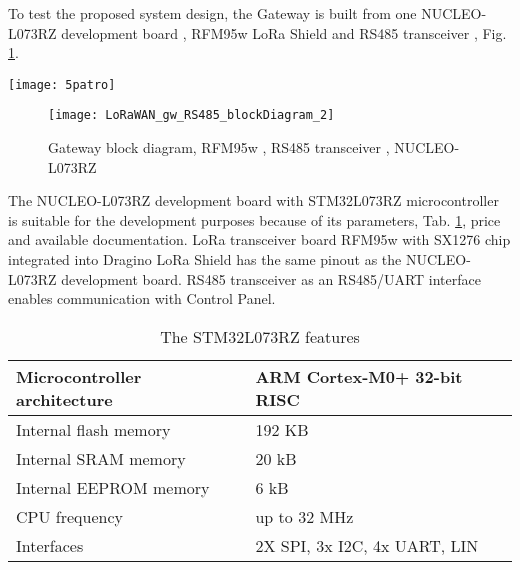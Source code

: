 To test the proposed system design, the Gateway is built from one NUCLEO-L073RZ development board \cite{nucleoST}, RFM95w LoRa Shield \cite{RFM95w} and RS485 transceiver \cite{rs485tr}, Fig. \ref{fig:gatewayBlockDiagram}.


\begin{figure*}[!ht]
    \centering
    \texttt{[image: 5patro]}
    \caption{Location of sensor nodes and CKP devices on the university floor}
    \label{fig:CorridorFloorPlan}
\end{figure*}


\begin{figure}[!h]
    \centering
    \texttt{[image: LoRaWAN\_gw\_RS485\_blockDiagram\_2]}
    \caption{Gateway block diagram, RFM95w \cite{RFM95w}, RS485 transceiver \cite{rs485tr}, NUCLEO-L073RZ \cite{nucleoST}}
    \label{fig:gatewayBlockDiagram}
\end{figure}

The NUCLEO-L073RZ development board with STM32L073RZ microcontroller is suitable for the development purposes because of its parameters, Tab. \ref{tab:mcuFeatures}, price and available documentation.
LoRa transceiver board RFM95w with SX1276 chip integrated into Dragino LoRa Shield has the same pinout as the NUCLEO-L073RZ development board. RS485 transceiver as an RS485/UART interface enables communication with Control Panel.



\begin{table}[h]
\centering
\footnotesize
\caption{The STM32L073RZ features \cite{nucleoST}}
\begin{tabular}{|l|p{3.5cm}|}
\hline
Microcontroller architecture & ARM Cortex-M0+ 32-bit RISC \\ \hline
Internal flash memory & 192 KB \\ \hline
Internal SRAM memory & 20 kB \\ \hline
Internal EEPROM memory & 6 kB \\ \hline
CPU frequency & up to 32 MHz \\ \hline
Interfaces & 2X SPI, 3x I2C, 4x UART, LIN \\ \hline
\end{tabular}
\label{tab:mcuFeatures}
\end{table}








